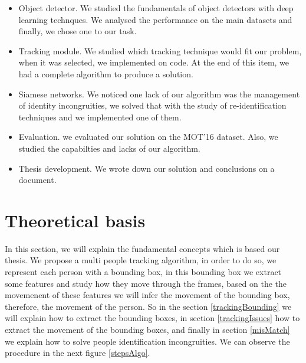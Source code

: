 \documentclass[12pt, a4paper, titlepage,twoside,openright]{article}
\begin{document}
\begin{itemize}


\item Object detector. We studied the fundamentals of object detectors with deep learning technques. We analysed the performance on the main datasets and finally, we chose one to our task.

\item Tracking module. We studied which tracking technique would fit our problem, when it was selected, we implemented on code. At the end of this item, we had a complete algorithm to produce a solution.

\item Siamese networks. We noticed one lack of our algorithm was the management of identity incongruities, we solved that with the study of re-identification techniques and we implemented one of them.

\item Evaluation. we evaluated our solution on the MOT'16 dataset. Also, we studied the capabilties and lacks of our algorithm.

\item Thesis development. We wrote down our solution and conclusions on a document.  

\end{itemize}



\section{Theoretical basis}\label{TheoriecArch}




In this section, we will explain the fundamental concepts which is based our thesis. We propose a multi people tracking algorithm, in order to do so, we represent each person with a bounding box, in this bounding box we extract some features and study how they move through the frames, based on the the movemenent of these features we will infer the movement of the bounding box, therefore, the movement of the person. So in the section \ref{trackingBounding} we will explain how to extract the bounding boxes, in section \ref{trackingIssues} how to extract the movement of the bounding boxes, and finally in section \ref{misMatch} we explain how to solve people identification incongruities. We can observe the procedure in the next figure \ref{stepsAlgo}.
\end{document}
